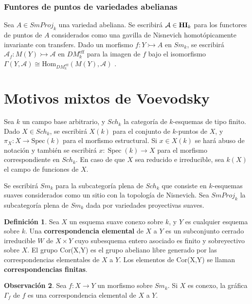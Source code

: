 \documentclass[10pt]{amsart}
\theoremstyle{definition}
\newtheorem{definition}{Definici\'on}[section]
\newtheorem{obs}[definition]{Observaci\'on}
\theoremstyle{remark}
\theoremstyle{definition}
\begin{document}
\subsubsection{Funtores de puntos de variedades abelianas}\label{NC}
Sea $A\in SmProj_{k}$ una variedad abeliana. Se escribirá $\mathcal{A}\in{\bf HI}_{k}$ para los functores de puntos de $A$ considerados como una gavilla de Nisnevich homotópicamente invariante con transfers\cite[Lem. 3.2, Rmk. 3.3]{SS03}. Dado un morfismo $f:Y\rightarrowtail A$ en $Sm_{k}$, se escribirá $\mathcal{A}_{f}:M(Y)\rightarrowtail\mathcal{A}$ en $DM^{\textrm{eff}}_{k}$ para la imagen de $f$ bajo el isomorfismo $\Gamma(Y,\mathcal{A})\cong\text{Hom}_{DM^{\textrm{eff}}_{k}}(M(Y),\mathcal{A})$ \cite[Prop. 3.1.9 and 3.2.3]{Voe00b}.

\newpage

\section{Motivos mixtos de Voevodsky}
Sea $k$ un campo base arbitrario, y $Sch_{k}$ la categoría de $k$-esquemas de tipo finito. Dado $X\in Sch_{k}$, se escribirá $X(k)$ para el conjunto de $k$-puntos de $X$, y $\pi_{X}:X\to\mathrm{Spec}(k)$ para el morfismo estructural. Si $x\in X(k)$ se hará abuso de notación y también se escribirá $x:\operatorname{Spec}(k)\to X$ para el morfismo correspondiente en $Sch_{k}$. En caso de que $X$ sea reducido e irreducible, sea $k(X)$ el campo de funciones de $X$.

Se escribirá $Sm_{k}$ para la subcategoría plena de $Sch_{k}$ que consiste en $k$-esquemas suaves considerados como un sitio con la topología de Nisnevich. Sea $SmProj_{k}$ la subcategoría plena de $Sm_{k}$ dada por variedades proyectivas suaves. 

\begin{definition}
Sea $X$ un esquema suave conexo sobre $\mathit{k}$, y $Y$ es cualquier esquema sobre $\mathit{k}$. Una \textbf{correspondencia elemental} de $X$ a $Y$ es un subconjunto cerrado irreducible $W$ de $X \times Y$ cuyo subesquema entero asociado es finito y sobreyectivo sobre $X$.
El grupo Cor(X,Y) es el grupo abeliano libre generado por las correspondencias elementales de $X$ a $Y$. Los elementos de Cor(X,Y) se llaman \textbf{correspondencias finitas}.
\end{definition} 

\begin{obs} Sea $f:X \rightarrow Y$ un morfismo sobre $Sm_{\mathit{k}}$. Si $X$ es conexo, la gráfica $\Gamma_{f}$ de $f$ es una correspondencia elemental de $X$ a $Y$.
\end{obs}
\end{document}
